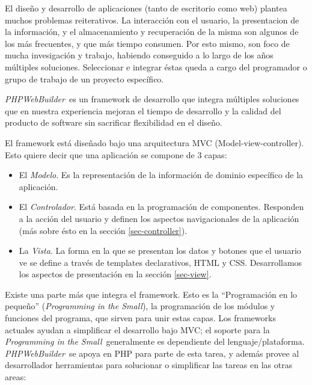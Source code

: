 \documentclass[a4paper,10pt,draft]{article}
\newcommand{\PITS}{\emph{Programming in the Small}} %
\newcommand{\PWB}{\emph{PHPWebBuilder}}
\begin{document}
El diseño y desarrollo de aplicaciones (tanto de escritorio como web) plantea muchos problemas reiterativos. La interacción con el usuario, la presentacion de la información, y el almacenamiento y recuperación de la misma son algunos de los más frecuentes, y que más tiempo consumen.
Por esto mismo, son foco de mucha invesigación y trabajo, habiendo conseguido a lo largo de los años múltiples soluciones. Seleccionar e integrar éstas queda a cargo del programador o grupo de trabajo de un proyecto específico.

\PWB \ es un framework de desarrollo que integra múltiples soluciones que en nuestra experiencia mejoran el tiempo de desarrollo y la calidad del producto de software sin sacrificar flexibilidad en el diseño.


El framework está diseñado bajo una arquitectura MVC (Model-view-controller)\cite{mvc}.
Esto quiere decir que una aplicación se compone de 3 capas:
\begin{itemize}
\item El \emph{Modelo}. Es la representación de la información de dominio específico de la aplicación.
\item El \emph{Controlador}. Está basada en la programación de componentes. Responden a la acción del usuario y definen los aspectos navigacionales de la aplicación (más sobre ésto en la sección \ref{sec-controller}).
\item La \emph{Vista}. La forma en la que se presentan los datos y botones que el usuario ve se define a través de templates declarativos, HTML y CSS. Desarrollamos los aspectos de presentación en la sección \ref{sec-view}.
\end{itemize}

Existe una parte más que integra el framework. Esto es la ``Programación en lo pequeño'' (\PITS), la programación de los módulos y funciones del programa, que sirven para unir estas capas. Los frameworks actuales ayudan a simplificar el desarrollo bajo MVC; el soporte para la \PITS \ generalmente es dependiente del lenguaje/plataforma. \PWB \ se apoya en PHP para parte de esta tarea, y además provee al desarrollador herramientas para solucionar o simplificar las tareas en las otras areas:
\end{document}
